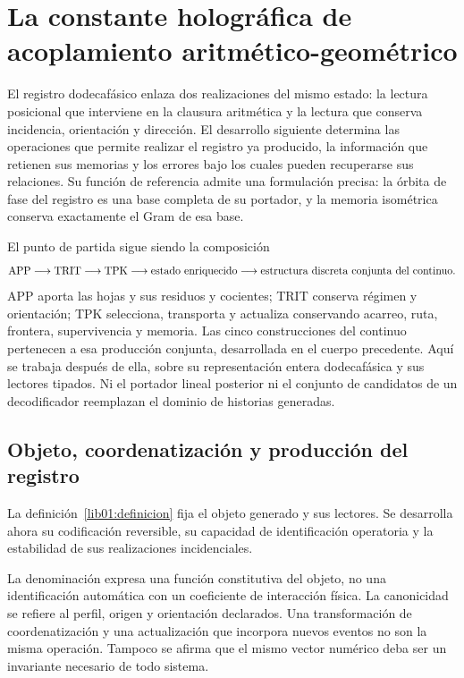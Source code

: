 \section{La constante holográfica de acoplamiento aritmético-geométrico}
\label{lib01:acoplamiento}

El registro dodecafásico enlaza dos realizaciones del mismo estado: la
lectura posicional que interviene en la clausura aritmética y la lectura
que conserva incidencia, orientación y dirección. El desarrollo siguiente
determina las operaciones que permite realizar el registro ya producido,
la información que retienen sus memorias y los errores bajo los cuales
pueden recuperarse sus relaciones.
Su función de referencia admite una formulación precisa: la órbita de fase
del registro es una base completa de su portador, y la memoria isométrica
conserva exactamente el Gram de esa base.

El punto de partida sigue siendo la composición
\[
 \mathrm{APP}\longrightarrow\mathrm{TRIT}\longrightarrow\mathrm{TPK}
 \longrightarrow\text{estado enriquecido}
 \longrightarrow\text{estructura discreta conjunta del continuo}.
\]
APP aporta las hojas y sus residuos y cocientes; TRIT conserva régimen y
orientación; TPK selecciona, transporta y actualiza conservando acarreo,
ruta, frontera, supervivencia y memoria. Las cinco construcciones del
continuo pertenecen a esa producción conjunta, desarrollada en el cuerpo
precedente. Aquí se trabaja después de ella, sobre su representación entera
dodecafásica y sus lectores tipados. Ni el portador lineal posterior ni el
conjunto de candidatos de un decodificador reemplazan el dominio de
historias generadas.

\subsection{Objeto, coordenatización y producción del registro}
\label{lib01:registro}

La definición~\ref{lib01:definicion} fija el objeto generado y sus lectores. Se desarrolla ahora su codificación reversible, su capacidad de identificación operatoria y la estabilidad de sus realizaciones incidenciales.

La denominación expresa una función constitutiva del objeto, no una
identificación automática con un coeficiente de interacción física. La
canonicidad se refiere al perfil, origen y orientación declarados. Una
transformación de coordenatización y una actualización que incorpora nuevos eventos
no son la misma operación. Tampoco se afirma que el mismo vector numérico
deba ser un invariante necesario de todo sistema.

